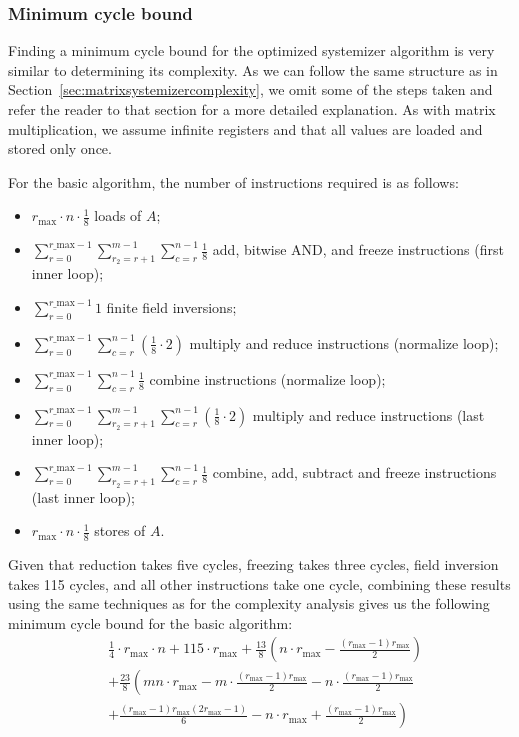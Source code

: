 \documentclass[11pt,a4paper]{report}
\theoremstyle{definition}
\begin{document}
\subsubsection{Minimum cycle bound}
Finding a minimum cycle bound for the optimized systemizer algorithm is very similar to determining its complexity. As we can follow the same structure as in Section~\ref{sec:matrixsystemizercomplexity}, we omit some of the steps taken and refer the reader to that section for a more detailed explanation. As with matrix multiplication, we assume infinite registers and that all values are loaded and stored only once.

For the basic algorithm, the number of instructions required is as follows:
\begin{itemize}
  \item $r_\text{max} \cdot n \cdot \frac{1}{8}$ loads of $A$;
  \item $\sum_{r=0}^{r\_\text{max}-1} \sum_{r_2=r+1}^{m-1} \sum_{c=r}^{n-1} \frac{1}{8}$ add, bitwise AND, and freeze instructions (first inner loop);
  \item $\sum_{r=0}^{r\_\text{max}-1} 1$ finite field inversions;
  \item $\sum_{r=0}^{r\_\text{max}-1} \sum_{c=r}^{n-1} (\frac{1}{8} \cdot 2)$ multiply and reduce instructions (normalize loop);
  \item $\sum_{r=0}^{r\_\text{max}-1} \sum_{c=r}^{n-1} \frac{1}{8}$ combine instructions (normalize loop);
  \item $\sum_{r=0}^{r\_\text{max}-1} \sum_{r_2=r+1}^{m-1} \sum_{c=r}^{n-1} (\frac{1}{8} \cdot 2)$ multiply and reduce instructions (last inner loop);
  \item $\sum_{r=0}^{r\_\text{max}-1} \sum_{r_2=r+1}^{m-1} \sum_{c=r}^{n-1} \frac{1}{8}$ combine, add, subtract and freeze instructions (last inner loop);
  \item $r_\text{max} \cdot n \cdot \frac{1}{8}$ stores of $A$.
\end{itemize}

Given that reduction takes five cycles, freezing takes three cycles, field inversion takes 115 cycles, and all other instructions take one cycle, combining these results using the same techniques as for the complexity analysis gives us the following minimum cycle bound for the basic algorithm:
\begin{align*}
   & \frac{1}{4} \cdot r_\text{max} \cdot n + 115 \cdot r_\text{max} + \frac{13}{8} \left( n \cdot r_\text{max} - \frac{(r_\text{max} - 1)r_{\text{max}}}{2} \right) \\
   & + \frac{23}{8} \left( mn \cdot r_\text{max} - m \cdot \frac{(r_\text{max} - 1)r_{\text{max}}}{2} - n \cdot \frac{(r_\text{max} - 1)r_{\text{max}}}{2} \right.   \\
   & \left. + \frac{(r_\text{max} - 1)r_{\text{max}}(2r_{\text{max}} - 1)}{6} - n \cdot r_\text{max} + \frac{(r_\text{max} - 1)r_{\text{max}}}{2} \right)
\end{align*}
\end{document}
